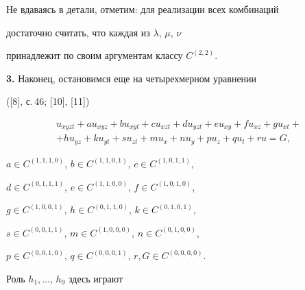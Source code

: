 Не вдаваясь в детали, отметим: для реализации всех комбинаций


достаточно считать, что каждая из $\lambda$, $\mu$, $\nu$


принадлежит по своим аргументам классу $C^{(2,2)}$.


\medskip





{\bf 3.} Наконец, остановимся еще на четырехмерном уравнении


([8], с.\,46; [10], [11])


\begin{multline}\label{28}


u_{xyzt}+au_{xyz}+bu_{xyt}+cu_{xzt}+du_{yzt}+eu_{xy}+fu_{xz}+gu_{xt}+\\


+hu_{yz}+ku_{yt}+su_{zt}+mu_{x}+nu_{y}+pu_{z}+qu_{t}+ru=G,


\end{multline}


$a\in C^{(1,1,1,0)}$, $b\in C^{(1,1,0,1)}$, $c\in C^{(1,0,1,1)}$,


$d\in C^{(0,1,1,1)}$, $e\in C^{(1,1,0,0)}$, $f\in C^{(1,0,1,0)}$,


$g\in C^{(1,0,0,1)}$, $h\in C^{(0,1,1,0)}$, $k\in C^{(0,1,0,1)}$,


$s\in C^{(0,0,1,1)}$, $m\in C^{(1,0,0,0)}$, $n\in C^{(0,1,0,0)}$,


$p\in C^{(0,0,1,0)}$, $q\in C^{(0,0,0,1)}$, $r, G\in C^{(0,0,0,0)}$.


Роль $h_{1},\dotsc$, $h_{9}$ здесь играют


